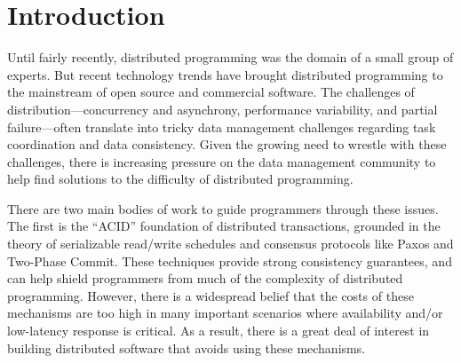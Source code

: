 \section{Introduction}
Until fairly recently, distributed programming was the domain of a small group of experts. But recent technology trends have brought distributed programming to the mainstream of open source and commercial software.  The challenges of distribution---concurrency and asynchrony, performance variability, and partial failure---often translate into tricky data management challenges regarding task coordination and data consistency.
Given the growing need to wrestle with these challenges, there is increasing pressure on the data management community to help find solutions to the difficulty of distributed programming.

There are two main bodies of work to guide programmers through these issues.  The first is the ``ACID'' foundation of distributed transactions, grounded in the theory of serializable read/write schedules and consensus protocols like Paxos and Two-Phase Commit.  These techniques provide strong consistency guarantees, and can help shield programmers from much of the complexity of distributed programming. However, there is a widespread belief that the costs of these mechanisms are too high in many important scenarios where availability and/or low-latency response is critical.
As a result, there is a great deal of interest in building distributed software that avoids using these mechanisms.

